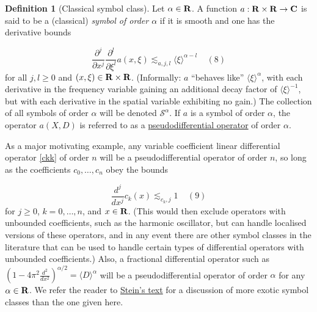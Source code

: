 \documentclass[11pt]{article}
\theoremstyle{definition}
\newtheorem{definition}[theorem]{Definition}
\theoremstyle{remark}
\begin{document}
\begin{definition}[Classical symbol class]
 \label{symb} Let \({\alpha \in {\bf R}}\). A function \({a: {\bf R} \times {\bf R} \rightarrow {\bf C}}\) is said to be a (classical) \emph{symbol of order \({\alpha}\)} if it is smooth and one has the derivative bounds \label{class-symb}

\[\displaystyle  \frac{\partial^j}{\partial x^j} \frac{\partial^l}{\partial \xi^l} a(x,\xi) \lesssim_{a,j,l} \langle \xi \rangle^{\alpha - l} \ \ \ \ \ (8)\]
 for all \({j,l \geq 0}\) and \({(x,\xi) \in {\bf R} \times {\bf R}}\). (Informally: \({a}\) “behaves like” \({\langle \xi \rangle^\alpha}\), with each derivative in the frequency variable gaining an additional decay factor of \({\langle \xi \rangle^{-1}}\), but with each derivative in the spatial variable exhibiting no gain.) The collection of all symbols of order \({\alpha}\) will be denoted \({{\mathcal S}^\alpha}\). If \({a}\) is a symbol of order \({\alpha}\), the operator \({a(X,D)}\) is referred to as a \href{https://en.wikipedia.org/wiki/Pseudo-differential_operator}{pseudodifferential operator} of order \({\alpha}\). 

\end{definition}

As a major motivating example, any variable coefficient linear differential operator \eqref{ckk} of order \({n}\) will be a pseudodifferential operator of order \({n}\), so long as the coefficients \({c_0,\dots,c_n}\) obey the bounds \label{cb}

\[\displaystyle  \frac{d^j}{d x^j} c_k(x) \lesssim_{c_k, j} 1 \ \ \ \ \ (9)\]
 for \({j \geq 0}\), \({k=0,\dots,n}\), and \({x \in {\bf R}}\). (This would then exclude operators with unbounded coefficients, such as the harmonic oscillator, but can handle localised versions of these operators, and in any event there are other symbol classes in the literature that can be used to handle certain types of differential operators with unbounded coefficients.) Also, a fractional differential operator such as \({(1 - 4\pi^2 \frac{d^2}{dx^2})^{\alpha/2} = \langle D \rangle^\alpha}\) will be a pseudodifferential operator of order \({\alpha}\) for any \({\alpha \in {\bf R}}\). We refer the reader to \href{https://mathscinet.ams.org/mathscinet-getitem?mr=1232192}{Stein’s text} for a discussion of more exotic symbol classes than the one given here.
\end{document}
